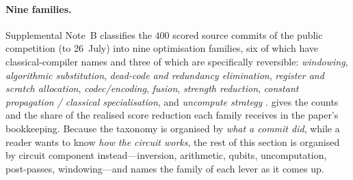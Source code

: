 \paragraph{Nine families.} Supplemental Note~B classifies the $400$ scored source commits of the public competition (to 26~July) into nine optimisation families, six of which have classical-compiler names and three of which are specifically reversible: \emph{windowing}, \emph{algorithmic substitution}, \emph{dead-code and redundancy elimination}, \emph{register and scratch allocation}, \emph{codec/encoding}, \emph{fusion}, \emph{strength reduction}, \emph{constant propagation / classical specialisation}, and \emph{uncompute strategy} \cite{ecdsafail26}.  gives the counts and the share of the realised score reduction each family receives in the paper's bookkeeping. Because the taxonomy is organised by \emph{what a commit did}, while a reader wants to know \emph{how the circuit works}, the rest of this section is organised by circuit component instead---inversion, arithmetic, qubits, uncomputation, post-passes, windowing---and names the family of each lever as it comes up.

